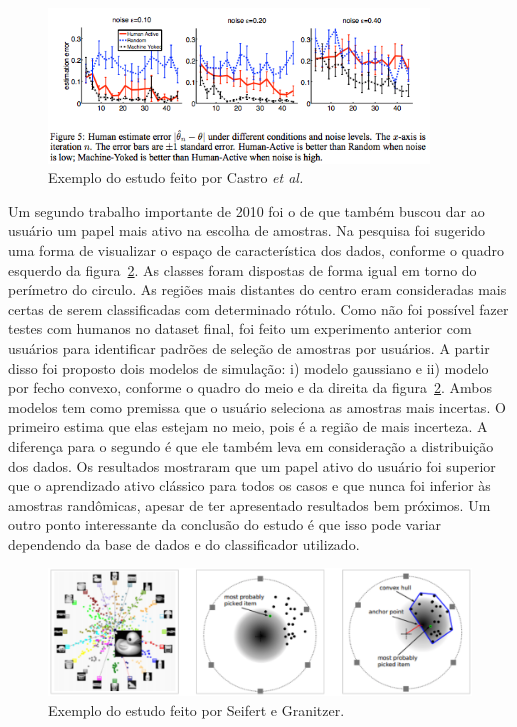 
\begin{figure}
  \centering
  \includegraphics[width=0.9\textwidth]{figures/human_active_learning_graph.png}
  \caption{Exemplo do estudo feito por Castro \emph{et al.}}
  \label{fig:human_active_learning_graph}
\end{figure}



Um segundo trabalho importante de 2010 foi o de \citep{seifert2010user} que também buscou dar ao usuário um papel mais ativo na escolha de amostras. Na pesquisa foi sugerido uma forma de visualizar o espaço de característica dos dados, conforme o quadro esquerdo da figura~\ref{fig:seifert_example}. As classes foram dispostas de forma igual em torno do perímetro do circulo. As regiões mais distantes do centro eram consideradas mais certas de serem classificadas com determinado rótulo. Como não foi possível fazer testes com humanos no dataset final, foi feito um experimento anterior com usuários para identificar padrões de seleção de amostras por usuários. A partir disso foi proposto dois modelos de simulação: i) modelo gaussiano e ii) modelo por fecho convexo, conforme o quadro do meio e da direita da figura~\ref{fig:seifert_example}. Ambos modelos tem como premissa que o usuário seleciona as amostras mais incertas. O primeiro estima que elas estejam no meio, pois é a região de mais incerteza. A diferença para o segundo é que ele também leva em consideração a distribuição dos dados. Os resultados mostraram que um papel ativo do usuário foi superior que o aprendizado ativo clássico para todos os casos e que nunca foi inferior às amostras randômicas, apesar de ter apresentado resultados bem próximos. Um outro ponto interessante da conclusão do estudo é que isso pode variar dependendo da base de dados e do classificador utilizado.

\begin{figure}
  \centering
  \includegraphics[width=1.0\textwidth]{figures/seifert_example.png}
  \caption{Exemplo do estudo feito por Seifert e Granitzer.}
  \label{fig:seifert_example}
\end{figure}

